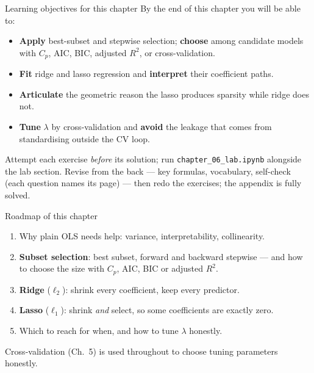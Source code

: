 \documentclass[aspectratio=169,11pt]{beamer}
\begin{document}
\begin{frame}{Learning objectives for this chapter}
  \small
  By the end of this chapter you will be able to:
  \begin{itemize}
    \item \textbf{Apply} best-subset and stepwise selection;
          \textbf{choose} among candidate models with $C_p$, AIC, BIC,
          adjusted $R^2$, or cross-validation.
    \item \textbf{Fit} ridge and lasso regression and \textbf{interpret}
          their coefficient paths.
    \item \textbf{Articulate} the geometric reason the lasso produces
          sparsity while ridge does not.
    \item \textbf{Tune} $\lambda$ by cross-validation and \textbf{avoid}
          the leakage that comes from standardising outside the CV loop.
  \end{itemize}
  \begin{readme}
    \footnotesize Attempt each exercise \emph{before} its solution; run
    \texttt{chapter\_06\_lab.ipynb} alongside the lab section. Revise from the
    back --- key formulas, vocabulary, self-check (each question names its
    page) --- then redo the exercises; the appendix is fully solved.
  \end{readme}
\end{frame}


\begin{frame}{Roadmap of this chapter}
  \begin{takeaway}
    \begin{enumerate}
      \item Why plain OLS needs help: variance, interpretability,
            collinearity.
      \item \textbf{Subset selection}: best subset, forward and backward
            stepwise --- and how to choose the size with $C_p$, AIC, BIC
            or adjusted $R^2$.
      \item \textbf{Ridge} ($\ell_2$): shrink every coefficient, keep
            every predictor.
      \item \textbf{Lasso} ($\ell_1$): shrink \emph{and} select, so some
            coefficients are exactly zero.
      \item Which to reach for when, and how to tune $\lambda$ honestly.
    \end{enumerate}
  \end{takeaway}
  Cross-validation (Ch.~5) is used throughout to choose tuning
  parameters honestly.
\end{frame}
\end{document}
